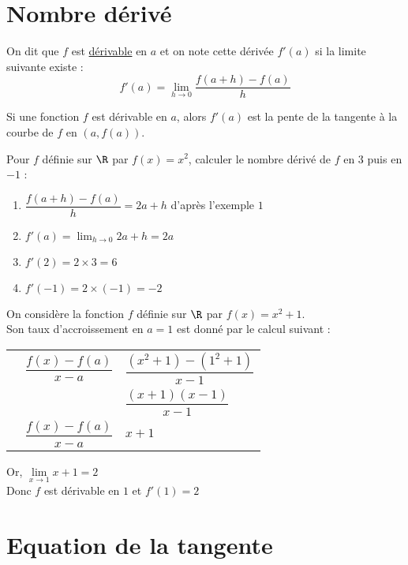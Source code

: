 \documentclass[12pt]{article}
\begin{document}
\section{Nombre dérivé} %

\begin{definition}
   On dit que $f$ est \underline{dérivable} en $a$ et on note cette dérivée $f'(a)$ si la limite suivante existe :
$$f'(a)=\lim_{h\to0}\frac{f(a+h)-f(a)}{h}$$
\end{definition}


\begin{propriete}
  Si une fonction $f$ est dérivable en $a$, alors $f'(a)$ est la pente de la
  tangente à la courbe de $f$ en $(a, f(a))$.
\end{propriete}

\begin{exemple}
  Pour $f$ définie sur $\R$ par $f(x)=x^2$, calculer le nombre dérivé de $f$ en $3$ puis en $-1$ :
   \begin{enumerate}
      \item $\dfrac{f(a+h)-f(a)}{h}=2a+h$ d'après l'exemple $1$
      \item $f'(a)=\lim_{h\to0}2a+h=2a $
      \item $f'(2)=2\times 3=6$
      \item $f'(-1)=2\times (-1)=-2$
   \end{enumerate}
\end{exemple}

\begin{exemple}
On considère la fonction $f$ définie sur $\R$ par $f(x)=x^2+1$.\\
Son taux d'accroissement en $a=1$ est donné par le calcul suivant :
\begin{center}
  \begin{tabular}{p{0.3cm}l!{=}l}
    &  $\dfrac{f(x)-f(a)}{x-a}$ & $\dfrac{(x^2+1)-(1^2+1)}{x-1}$ \\
    & & $\dfrac{(x+1)(x-1)}{x-1}$ \\
    &   $\dfrac{f(x)-f(a)}{x-a}$ & $x+1$ \\
  \end{tabular}
\end{center}
Or, $\lim\limits_{x\to1}x+1=2$\\
Donc $f$ est dérivable en $1$ et $f'(1)=2$
\end{exemple}

\section{Equation de la tangente} %
\end{document}
